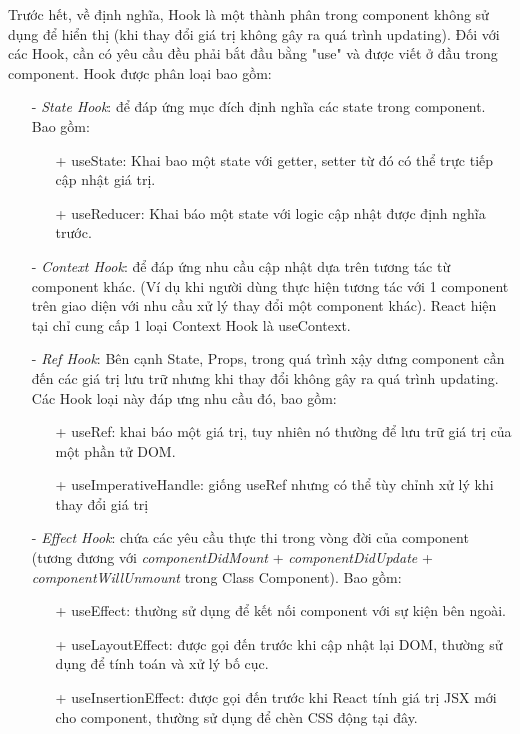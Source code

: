     Trước hết, về định nghĩa, Hook là một thành phân trong component không sử dụng để hiển thị (khi thay đổi giá trị không gây ra quá trình updating). Đối với các Hook, cần có yêu cầu đều phải bắt đầu bằng "use" và được viết ở đầu trong component.
    Hook được phân loại bao gồm:
    \begin{enumerate}
        \item[-] {\textit{State Hook}}: để đáp ứng mục đích định nghĩa các state trong component. Bao gồm:
        \begin{enumerate}
            \item[+] useState: Khai bao một state với getter, setter từ đó có thể trực tiếp cập nhật giá trị.
            \item[+] useReducer: Khai báo một state với logic cập nhật được định nghĩa trước.
        \end{enumerate}
        \item[-] {\textit{Context Hook}}: để đáp ứng nhu cầu cập nhật dựa trên tương tác từ component khác. (Ví dụ khi người dùng thực hiện tương tác với 1 component trên giao diện với nhu cầu xử lý thay đổi một component khác). React hiện tại chỉ cung cấp 1 loại Context Hook là useContext.
        \item[-] {\textit{Ref Hook}}: Bên cạnh State, Props, trong quá trình xậy dưng component cần đến các giá trị lưu trữ nhưng khi thay đổi không gây ra quá trình updating. Các Hook loại này đáp ưng nhu cầu đó, bao gồm:
        \begin{enumerate}
            \item[+] useRef: khai báo một giá trị, tuy nhiên nó thường để lưu trữ giá trị của một phần tử DOM.
            \item[+] useImperativeHandle: giống useRef nhưng có thể tùy chỉnh xử lý khi thay đổi giá trị
        \end{enumerate}
        \item[-] {\textit{Effect Hook}}: chứa các yêu cầu thực thi trong vòng đời của component (tương đương với \textit{componentDidMount} + \textit{componentDidUpdate} + \textit{componentWillUnmount} trong Class Component). Bao gồm:
        \begin{enumerate}
            \item[+] useEffect: thường sử dụng để kết nối component với sự kiện bên ngoài.
            \item[+] useLayoutEffect: được gọi đến trước khi cập nhật lại DOM, thường sử dụng để tính toán và xử lý bố cục.
            \item[+] useInsertionEffect: được gọi đến trước khi React tính giá trị JSX mới cho component, thường sử dụng để chèn CSS động tại đây.

\end{enumerate}
\end{enumerate}
